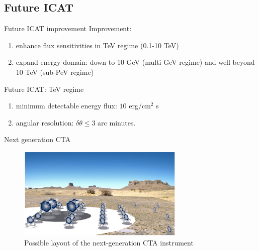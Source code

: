 \documentclass{beamer}
\begin{document}
\subsection{Future ICAT}
\begin{frame}{Future ICAT improvement}
	Improvement:
	\begin{enumerate}
		\item enhance flux sensitivities in TeV regime (0.1-10 TeV)
		\item expand energy domain: down to 10 GeV (multi-GeV regime) and well beyond 10 TeV (sub-PeV regime)
	\end{enumerate}
\end{frame}


\begin{frame}{Future ICAT: TeV regime}
	\begin{enumerate}
		\item minimum detectable energy flux: $10$ erg$/ \text{cm}^2 $ s
		\item angular resolution: $\delta \theta \leq 3$ arc minutes.
	\end{enumerate}
\end{frame}


\begin{frame}{Next generation CTA}
	\begin{figure}[h]
		\includegraphics[width=300px]{next-generationCTA.png}
		\caption{Possible layout of the next-generation CTA instrument}
	\end{figure}
\end{frame}
\end{document}
